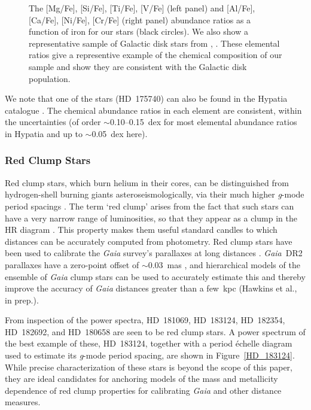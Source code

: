 \documentclass[modern]{aastex62}
\newcommand{\gaia}{\textit{Gaia}\xspace}
\begin{document}
\begin{figure*}
\caption{\label{fig:ncap}
The [Mg/Fe], [Si/Fe], [Ti/Fe], [V/Fe] (left panel) and [Al/Fe], [Ca/Fe], [Ni/Fe], [Cr/Fe] (right panel) abundance ratios as a function of iron for our stars (black circles). We also show a representative sample of Galactic disk stars from \citet[red,][]{Bensby2014}, \citet[blue][]{Battistini2016}. These elemental ratios give a representive example of the chemical composition of our sample and show they are consistent with the Galactic disk population. } %
\end{figure*}


We note that one of the stars (HD~175740) can also be found in the Hypatia catalogue \citep{hypatia}. The chemical abundance ratios in each element are consistent, within the uncertainties (of order $\sim$0.10--0.15~dex for most elemental abundance ratios in Hypatia and up to $\sim$0.05~dex here). 

\subsubsection{Red Clump Stars}
\label{clumpstars}

Red clump stars, which burn helium in their cores, can be distinguished from hydrogen-shell burning giants asteroseismologically, via their much higher \textit{g}-mode period spacings \citep{rggmodehelium}. 
The term `red clump' arises from the fact that such stars can have a very narrow range of luminosities, so that they appear as a clump in the HR diagram \citep{2016ARA&A..54...95G}. This property makes them useful standard candles to which distances can be accurately computed from photometry. Red clump stars have been used to calibrate the \gaia survey's parallaxes at long distances \citep{2017A&A...598L...4D,2017MNRAS.471..722H,2018A&A...609A.116R}. \gaia~DR2 parallaxes have a zero-point offset of $\sim 0.03$~mas \citep{gaiadr2parallax}, and hierarchical models of the ensemble of \gaia clump stars can be used to accurately estimate this and thereby improve the accuracy of \gaia distances greater than a few~kpc (Hawkins et al., in prep.).

From inspection of the power spectra, HD~181069, HD~183124, HD~182354, HD~182692, and HD~180658 are seen to be red clump stars. A power spectrum of the best example of these, HD~183124, together with a period \'{e}chelle diagram used to estimate its \textit{g}-mode period spacing, are shown in Figure~\ref{HD_183124}. While precise characterization of these stars is beyond the scope of this paper, they are ideal candidates for anchoring models of the mass and metallicity dependence of red clump properties for calibrating \gaia and other distance measures. 
\end{document}

